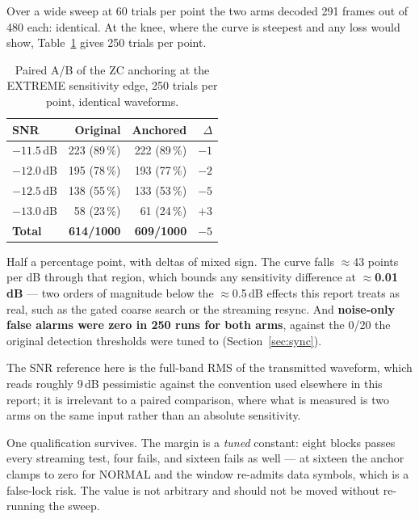 Over a wide sweep at 60 trials per point the two arms decoded 291
frames out of 480 each: identical. At the knee, where the curve is
steepest and any loss would show, Table~\ref{tab:zcab} gives 250 trials
per point.

\begin{table}[htbp]
    \centering
    \caption{Paired A/B of the ZC anchoring at the EXTREME sensitivity
             edge, 250 trials per point, identical waveforms.}
    \label{tab:zcab}
    \small
    \begin{tabular}{@{}lrrr@{}}
    \toprule
    \textbf{SNR} & \textbf{Original} & \textbf{Anchored} &
    \textbf{$\Delta$} \\
    \midrule
    $-11.5$\,dB & 223 (89\,\%) & 222 (89\,\%) & $-1$ \\
    $-12.0$\,dB & 195 (78\,\%) & 193 (77\,\%) & $-2$ \\
    $-12.5$\,dB & 138 (55\,\%) & 133 (53\,\%) & $-5$ \\
    $-13.0$\,dB & \phantom{0}58 (23\,\%) & \phantom{0}61 (24\,\%) &
        $+3$ \\
    \midrule
    \textbf{Total} & \textbf{614/1000} & \textbf{609/1000} &
        \textbf{$-5$} \\
    \bottomrule
    \end{tabular}
\end{table}

Half a percentage point, with deltas of mixed sign. The curve falls
$\approx$43 points per dB through that region, which bounds any
sensitivity difference at \textbf{$\approx$0.01\,dB} --- two orders of
magnitude below the $\approx$0.5\,dB effects this report treats as real,
such as the gated coarse search or the streaming resync. And
\textbf{noise-only false alarms were zero in 250 runs for both arms},
against the 0/20 the original detection thresholds were tuned to
(Section~\ref{sec:sync}).

The SNR reference here is the full-band RMS of the transmitted
waveform, which reads roughly 9\,dB pessimistic against the convention
used elsewhere in this report; it is irrelevant to a paired comparison,
where what is measured is two arms on the same input rather than an
absolute sensitivity.

One qualification survives. The margin is a \emph{tuned} constant:
eight blocks passes every streaming test, four fails, and sixteen fails
as well --- at sixteen the anchor clamps to zero for NORMAL and the
window re-admits data symbols, which is a false-lock risk. The value is
not arbitrary and should not be moved without re-running the sweep.

